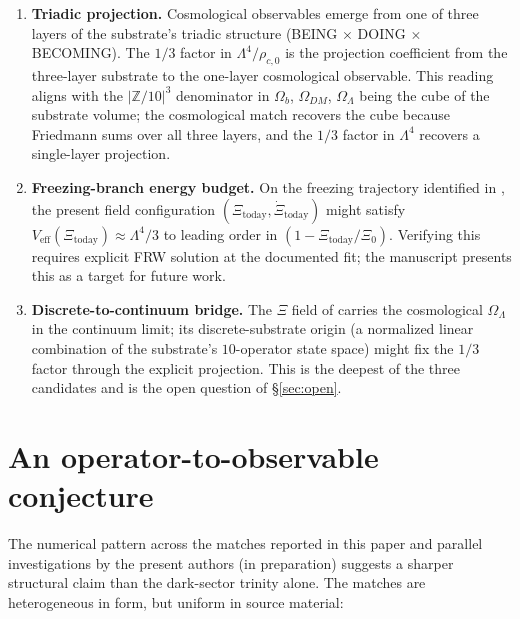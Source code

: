 \documentclass[11pt,reqno]{amsart}
\theoremstyle{plain}
\theoremstyle{definition}
\theoremstyle{remark}
\newcommand{\Z}{\mathbb{Z}}
\begin{document}
\begin{enumerate}
\item \textbf{Triadic projection.} Cosmological observables
emerge from one of three layers of the substrate's triadic
structure (BEING $\times$ DOING $\times$ BECOMING). The $1/3$
factor in $\Lambda^{4}/\rho_{c,0}$ is the projection coefficient
from the three-layer substrate to the one-layer cosmological
observable. This reading aligns with the $|\Z/10|^{3}$ denominator
in $\Omega_b$, $\Omega_{DM}$, $\Omega_\Lambda$ being the cube of
the substrate volume; the cosmological match recovers the cube
because Friedmann sums over all three layers, and the $1/3$
factor in $\Lambda^{4}$ recovers a single-layer projection.

\item \textbf{Freezing-branch energy budget.} On the freezing
trajectory identified in \cite{SandersGish2026JCAP}, the
present field configuration $(\Xi_\mathrm{today},
\dot\Xi_\mathrm{today})$ might satisfy
$V_\mathrm{eff}(\Xi_\mathrm{today}) \approx \Lambda^{4}/3$ to
leading order in $(1 - \Xi_\mathrm{today}/\Xi_{0})$. Verifying
this requires explicit FRW solution at the documented fit; the
manuscript presents this as a target for future work.

\item \textbf{Discrete-to-continuum bridge.} The $\Xi$ field of
\cite{SandersGish2026JCAP} carries the cosmological
$\Omega_\Lambda$ in the continuum limit; its discrete-substrate
origin (a normalized linear combination of the substrate's
$10$-operator state space) might fix the $1/3$ factor through
the explicit projection. This is the deepest of the three
candidates and is the open question of \S\ref{sec:open}.
\end{enumerate}

\section{An operator-to-observable conjecture}\label{sec:meta-conjecture}

The numerical pattern across the matches reported in this paper
and parallel investigations by the present authors (in
preparation) suggests a sharper structural claim than the
dark-sector trinity alone. The matches are heterogeneous in form,
but uniform in source material:
\end{document}

